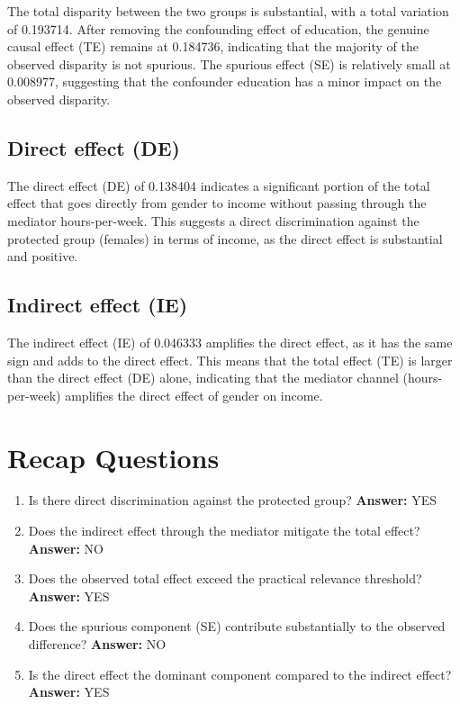 \documentclass[11pt]{article}
\begin{document}
The total disparity between the two groups is substantial, with a total variation of 0.193714. After removing the confounding effect of education, the genuine causal effect (TE) remains at 0.184736, indicating that the majority of the observed disparity is not spurious. The spurious effect (SE) is relatively small at 0.008977, suggesting that the confounder education has a minor impact on the observed disparity.

\subsection{Direct effect (DE)}

The direct effect (DE) of 0.138404 indicates a significant portion of the total effect that goes directly from gender to income without passing through the mediator hours-per-week. This suggests a direct discrimination against the protected group (females) in terms of income, as the direct effect is substantial and positive.

\subsection{Indirect effect (IE)}

The indirect effect (IE) of 0.046333 amplifies the direct effect, as it has the same sign and adds to the direct effect. This means that the total effect (TE) is larger than the direct effect (DE) alone, indicating that the mediator channel (hours-per-week) amplifies the direct effect of gender on income.

\section{Recap Questions}

\begin{enumerate}
\item Is there direct discrimination against the protected group? \textbf{Answer:} YES
\item Does the indirect effect through the mediator mitigate the total effect? \textbf{Answer:} NO
\item Does the observed total effect exceed the practical relevance threshold? \textbf{Answer:} YES
\item Does the spurious component (SE) contribute substantially to the observed difference? \textbf{Answer:} NO
\item Is the direct effect the dominant component compared to the indirect effect? \textbf{Answer:} YES
\end{enumerate}
\end{document}
